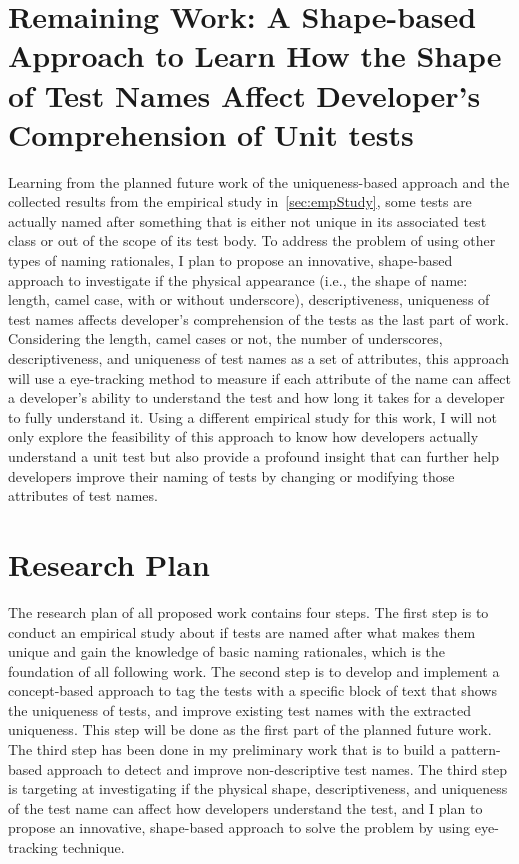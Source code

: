 \section{Remaining Work: A Shape-based Approach to Learn How the Shape of Test Names Affect Developer's Comprehension of Unit tests}
\label{sec:remaining2}

Learning from the planned future work of the uniqueness-based approach and the collected results from the empirical study in~\cref{sec:empStudy}, some tests are actually named after something that is either not unique in its associated test class or out of the scope of its test body.
%
To address the problem of using other types of naming rationales, I plan to propose an innovative, shape-based approach to investigate if the physical appearance (i.e., the shape of name: length, camel case, with or without underscore), descriptiveness, uniqueness of test names affects developer's comprehension of the tests as the last part of work.
%
Considering the length, camel cases or not, the number of underscores, descriptiveness, and uniqueness of test names as a set of attributes, this approach will use a eye-tracking method to measure if each attribute of the name can affect a developer's ability to understand the test and how long it takes for a developer to fully understand it.
%
Using a different empirical study for this work, I will not only explore the feasibility of this approach to know how developers actually understand a unit test but also provide a profound insight that can further help developers improve their naming of tests by changing or modifying those attributes of test names.

\section{Research Plan}

The research plan of all proposed work contains four steps.
%
The first step is to conduct an empirical study about if tests are named after what makes them unique and gain the knowledge of basic naming rationales, which is the foundation of all following work.
%
The second step is to develop and implement a concept-based approach to tag the tests with a specific block of text that shows the uniqueness of tests, and improve existing test names with the extracted uniqueness.
%
This step will be done as the first part of the planned future work.
%
The third step has been done in my preliminary work that is to build a pattern-based approach to detect and improve non-descriptive test names.
%
The third step is targeting at investigating if the physical shape, descriptiveness, and uniqueness of the test name can affect how developers understand the test, and I plan to propose an innovative, shape-based approach to solve the problem by using eye-tracking technique.